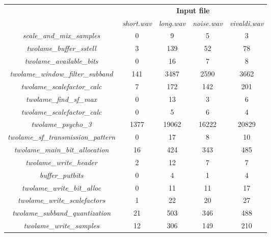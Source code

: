 \begin{table}[H]
    \centering
    \begin{tabular}{|c|c|c|c|c|}
    \cline{2-5}
    \multicolumn{1}{c|}{}  & \multicolumn{4}{c|}{\textbf{Input file}} \\
    \cline{2-5}
    \multicolumn{1}{c|}{} & \textit{short.wav} & \textit{long.wav} & \textit{noise.wav} & \textit{vivaldi.wav} \\
    \hline
    \multicolumn{1}{|c|}{\textit{scale\_and\_mix\_samples}}  & 0 & 9 & 5 & 3 \\ 
   \hline
    \multicolumn{1}{|c|}{\textit{twolame\_buffer\_sstell}} & 3 & 139 & 52 & 78 \\ 
    \hline
     \multicolumn{1}{|c|}{\textit{twolame\_available\_bits}} & 0 & 16 & 7 & 8  \\ 
    \hline
     \multicolumn{1}{|c|}{\textit{twolame\_window\_filter\_subband}} & 141  & 3487 & 2590 & 3662  \\ 
    \hline
     \multicolumn{1}{|c|}{\textit{twolame\_scalefactor\_calc}} & 7 & 172 & 142 &  201  \\ 
    \hline
     \multicolumn{1}{|c|}{\textit{twolame\_find\_sf\_max}} & 0  & 13 & 3 & 6   \\ 
    \hline
     \multicolumn{1}{|c|}{\textit{twolame\_scalefactor\_calc}} & 0  & 5 & 6 & 4  \\ 
    \hline
      \multicolumn{1}{|c|}{\textit{twolame\_psycho\_3}} & 1377  & 19062 & 16222 &  20829 \\ 
     \hline
     \multicolumn{1}{|c|}{\textit{twolame\_sf\_transmission\_pattern}} & 0 & 17 & 8 &  10 \\ 
    \hline
     \multicolumn{1}{|c|}{\textit{twolame\_main\_bit\_allocation}} & 16  & 424 & 343 & 485  \\ 
    \hline
     \multicolumn{1}{|c|}{\textit{twolame\_write\_header}} & 2 & 12 & 7 &  7 \\
    \hline
     \multicolumn{1}{|c|}{\textit{buffer\_putbits}} & 0 & 4 & 1 & 4  \\
    \hline
     \multicolumn{1}{|c|}{\textit{twolame\_write\_bit\_alloc}} & 0 & 11 & 11 &  17 \\
    \hline
     \multicolumn{1}{|c|}{\textit{twolame\_write\_scalefactors}} & 1 & 22 & 20 & 27 \\
    \hline
     \multicolumn{1}{|c|}{\textit{twolame\_subband\_quantization}} & 21 & 503 & 346 & 488 \\
    \hline
     \multicolumn{1}{|c|}{\textit{twolame\_write\_samples}} & 12 & 306 & 149 & 210 \\

\end{tabular}
\end{table}
